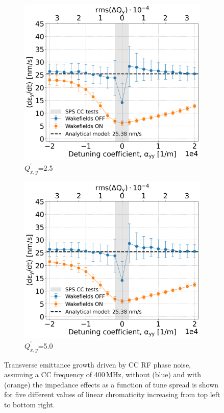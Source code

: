 \begin{figure}[htp]
\begin{subfigure}{.45\textwidth}
        \label{fig:study_6_chroma_scan_Qpxy1}
    \end{subfigure}
    \begin{subfigure}{.45\textwidth}
        \centering
        \includegraphics[width=.95\linewidth]{images/Ch7/Qpx25e-1.png}  
        \caption{$Q^\prime_{x,y}$=2.5}
        \label{fig:study_6_chroma_scan_Qpxy25e-1}
    \end{subfigure}
    \begin{subfigure}{.45\textwidth}
        \centering
        \includegraphics[width=.95\linewidth]{images/Ch7/Qpx5.png}  
        \caption{$Q^\prime_{x,y}$=5.0}
        \label{fig:study_6_chroma_scan_Qpxy5}
    \end{subfigure}
    \caption{Transverse emittance growth driven by CC RF phase noise, assuming a CC frequency of 400\,MHz, without (blue) and with (orange) the impedance effects as a function of tune spread is shown for five different values of linear chromaticity increasing from top left to bottom right.}
    \label{fig:study_6_chroma_scan}
\end{figure}

